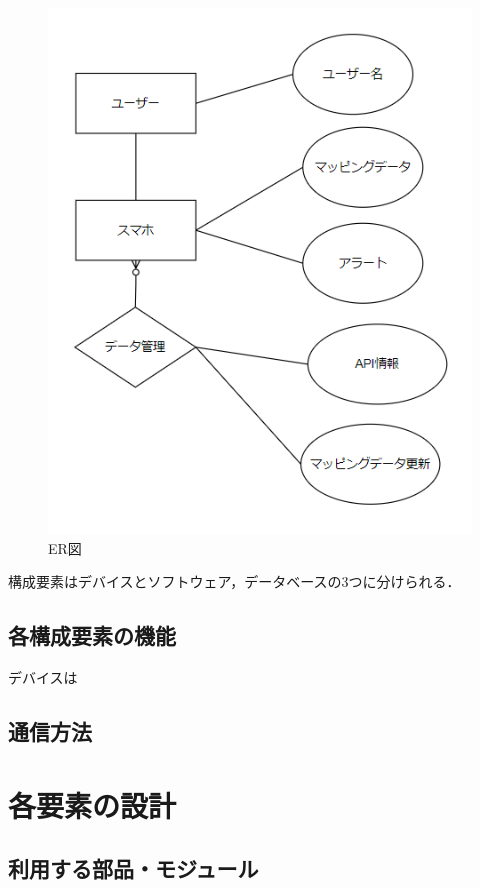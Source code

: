 \documentclass[titlepage,a4paper]{jsarticle}
\begin{document}
\begin{figure}[H]
  \centering
  \includegraphics[width=\textwidth]{img/ER_fig.png}
  \caption{ER図}
  \label{ER図}
\end{figure}

構成要素はデバイスとソフトウェア，データベースの3つに分けられる．
\subsection{各構成要素の機能}
デバイスは
\subsection{通信方法}

\section{各要素の設計}
\subsection{利用する部品・モジュール}
\end{document}

